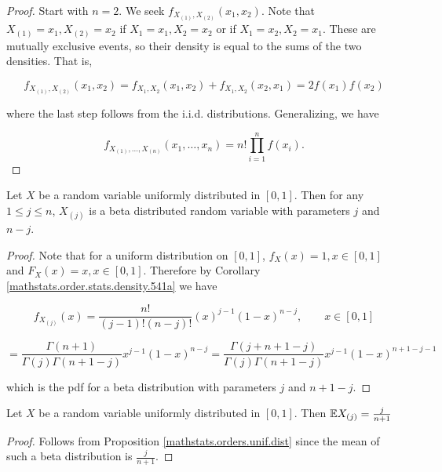 \begin{proof} Start with \(n=2\). We seek \(f_{X_{(1)}, X_{(2)}}(x_1,  x_2) \). Note that \(X_{(1)} = x_1, X_{(2)} = x_2\) if \(X_1 = x_1, X_2 = x_2\) or if \(X_1 = x_2, X_2 = x_1\). These are mutually exclusive events, so their density is equal to the sums of the two densities. That is,

\[
f_{X_{(1)}, X_{(2)}}(x_1,  x_2) = f_{X_1, X_2} (x_1, x_2) +  f_{X_1, X_2} (x_2, x_1) = 2 f(x_1) f(x_2)
\]

where the last step follows from the i.i.d. distributions. Generalizing, we have

\[
f_{X_{(1)}, \ldots, X_{(n)}}(x_1, \ldots, x_n) = n! \prod_{i=1}^n f(x_i).
\]

\end{proof}

\begin{proposition}\label{mathstats.orders.unif.dist}Let $X$ be a random variable uniformly distributed in $[0,1]$. Then for any $1\leq j\leq n$, $X_{(j)}$ is a beta distributed random variable with parameters $j$ and $n-j$. 
\end{proposition}

\begin{proof} Note that for a uniform distribution on \([0,1]\), \(f_X(x) = 1, x \in [0,1]\) and \(F_X(x) = x, x \in [0,1]\). Therefore by Corollary \ref{mathstats.order.stats.density.541a} we have

\[
f_{X_{(j)}}(x) =\frac{n!}{(j-1)!(n-j)!} (x)^{j-1}(1-x)^{n-j},\qquad x\in [0,1]
\]

\[
 =\frac{\Gamma(n+1)}{\Gamma(j) \Gamma(n+1-j)} x^{j-1}(1-x)^{n-j}  =\frac{\Gamma(j + n + 1 - j)}{\Gamma(j) \Gamma(n + 1 - j)} x^{j-1}(1-x)^{n+1-j - 1}
 \]


which is the pdf for a beta distribution with parameters \(j\) and \(n + 1 -j\). 

\end{proof}

\begin{corollary}Let $X$ be a random variable uniformly distributed in $[0,1]$. Then \(\E X_{(j)}=\frac{j}{n+1}\)

\end{corollary}

\begin{proof} Follows from Proposition \ref{mathstats.orders.unif.dist} since the mean of such a beta distribution is \(\frac{j}{n+1}\).

\end{proof}

